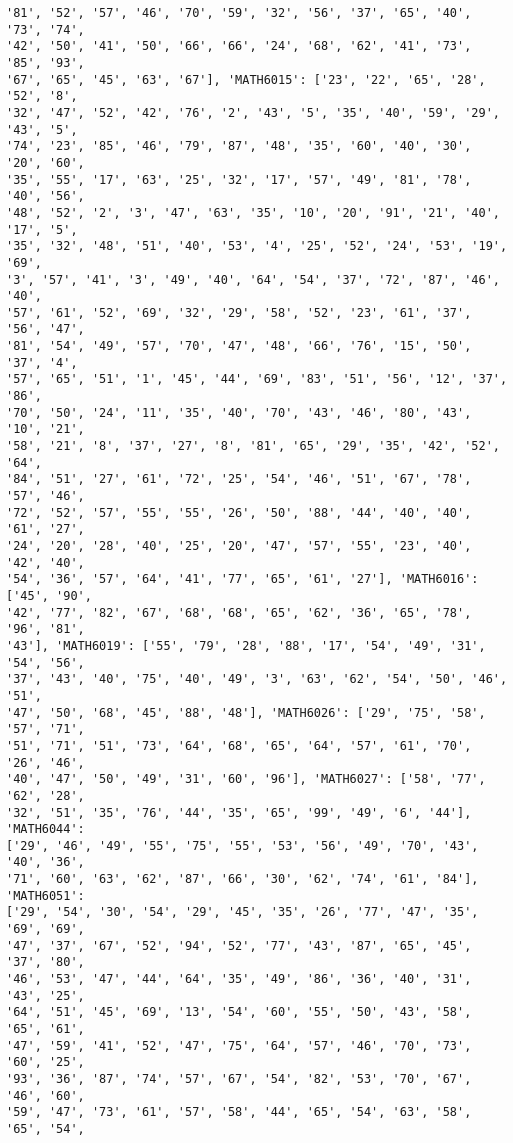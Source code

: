\documentclass[11pt]{article}
\begin{document}
\begin{Verbatim}[commandchars=\\\{\}]
'81', '52', '57', '46', '70', '59', '32', '56', '37', '65', '40', '73', '74',
'42', '50', '41', '50', '66', '66', '24', '68', '62', '41', '73', '85', '93',
'67', '65', '45', '63', '67'], 'MATH6015': ['23', '22', '65', '28', '52', '8',
'32', '47', '52', '42', '76', '2', '43', '5', '35', '40', '59', '29', '43', '5',
'74', '23', '85', '46', '79', '87', '48', '35', '60', '40', '30', '20', '60',
'35', '55', '17', '63', '25', '32', '17', '57', '49', '81', '78', '40', '56',
'48', '52', '2', '3', '47', '63', '35', '10', '20', '91', '21', '40', '17', '5',
'35', '32', '48', '51', '40', '53', '4', '25', '52', '24', '53', '19', '69',
'3', '57', '41', '3', '49', '40', '64', '54', '37', '72', '87', '46', '40',
'57', '61', '52', '69', '32', '29', '58', '52', '23', '61', '37', '56', '47',
'81', '54', '49', '57', '70', '47', '48', '66', '76', '15', '50', '37', '4',
'57', '65', '51', '1', '45', '44', '69', '83', '51', '56', '12', '37', '86',
'70', '50', '24', '11', '35', '40', '70', '43', '46', '80', '43', '10', '21',
'58', '21', '8', '37', '27', '8', '81', '65', '29', '35', '42', '52', '64',
'84', '51', '27', '61', '72', '25', '54', '46', '51', '67', '78', '57', '46',
'72', '52', '57', '55', '55', '26', '50', '88', '44', '40', '40', '61', '27',
'24', '20', '28', '40', '25', '20', '47', '57', '55', '23', '40', '42', '40',
'54', '36', '57', '64', '41', '77', '65', '61', '27'], 'MATH6016': ['45', '90',
'42', '77', '82', '67', '68', '68', '65', '62', '36', '65', '78', '96', '81',
'43'], 'MATH6019': ['55', '79', '28', '88', '17', '54', '49', '31', '54', '56',
'37', '43', '40', '75', '40', '49', '3', '63', '62', '54', '50', '46', '51',
'47', '50', '68', '45', '88', '48'], 'MATH6026': ['29', '75', '58', '57', '71',
'51', '71', '51', '73', '64', '68', '65', '64', '57', '61', '70', '26', '46',
'40', '47', '50', '49', '31', '60', '96'], 'MATH6027': ['58', '77', '62', '28',
'32', '51', '35', '76', '44', '35', '65', '99', '49', '6', '44'], 'MATH6044':
['29', '46', '49', '55', '75', '55', '53', '56', '49', '70', '43', '40', '36',
'71', '60', '63', '62', '87', '66', '30', '62', '74', '61', '84'], 'MATH6051':
['29', '54', '30', '54', '29', '45', '35', '26', '77', '47', '35', '69', '69',
'47', '37', '67', '52', '94', '52', '77', '43', '87', '65', '45', '37', '80',
'46', '53', '47', '44', '64', '35', '49', '86', '36', '40', '31', '43', '25',
'64', '51', '45', '69', '13', '54', '60', '55', '50', '43', '58', '65', '61',
'47', '59', '41', '52', '47', '75', '64', '57', '46', '70', '73', '60', '25',
'93', '36', '87', '74', '57', '67', '54', '82', '53', '70', '67', '46', '60',
'59', '47', '73', '61', '57', '58', '44', '65', '54', '63', '58', '65', '54',

\end{Verbatim}
\end{document}
